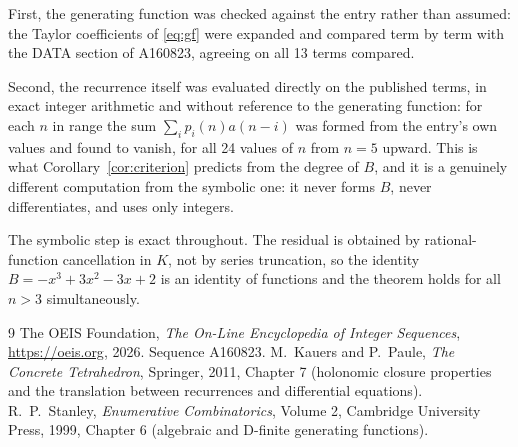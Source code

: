 \documentclass[11pt,a4paper]{article}
\theoremstyle{plain}
\theoremstyle{definition}
\begin{document}
First, the generating function was checked against the entry rather than assumed: the
Taylor coefficients of \eqref{eq:gf} were expanded and compared term by term with the DATA
section of A160823, agreeing on all 13 terms compared.

Second, the recurrence itself was evaluated directly on the published terms, in exact
integer arithmetic and without reference to the generating function: for each $n$ in range
the sum $\sum_{i}p_{i}(n)a(n-i)$ was formed from the entry's own values and found to
vanish, for all 24 values of $n$ from $n=5$ upward. This is what
Corollary~\ref{cor:criterion} predicts from the degree of $B$, and it is a genuinely
different computation from the symbolic one: it never forms $B$, never differentiates, and
uses only integers.

The symbolic step is exact throughout. The residual is obtained by rational-function
cancellation in $K$, not by series truncation, so the identity $B=- x^{3} + 3 x^{2} - 3 x + 2$ is an
identity of functions and the theorem holds for all $n>3$ simultaneously.

\begin{thebibliography}{9}
 The OEIS Foundation, \emph{The On-Line Encyclopedia of Integer Sequences},
\url{https://oeis.org}, 2026. Sequence A160823.
 M.~Kauers and P.~Paule, \emph{The Concrete Tetrahedron}, Springer, 2011,
Chapter 7 (holonomic closure properties and the translation between recurrences and
differential equations).
 R.~P.~Stanley, \emph{Enumerative Combinatorics}, Volume 2, Cambridge
University Press, 1999, Chapter 6 (algebraic and D-finite generating functions).
\end{thebibliography}
\end{document}
